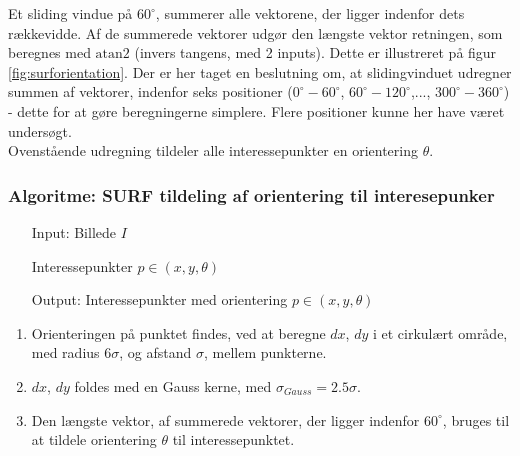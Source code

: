 Et sliding vindue på $60^{\circ}$, summerer alle vektorene, der ligger indenfor dets rækkevidde. Af de summerede vektorer udgør den længste vektor retningen, som beregnes med $\text{atan2}$ (invers tangens, med 2 inputs). Dette er illustreret på figur \ref{fig:surforientation}. Der er her taget en beslutning om, at slidingvinduet udregner summen af vektorer, indenfor seks positioner ($0^{\circ}-60^{\circ}$, $60^{\circ}-120^{\circ}$,..., $300^{\circ}-360^{\circ}$) - dette for at gøre beregningerne simplere. Flere positioner kunne her have været undersøgt.
\\
Ovenstående udregning tildeler alle interessepunkter en orientering $\theta$.
\subsubsection*{Algoritme: SURF tildeling af orientering til interesepunker}
\begin{enumerate}
\item[Input:] Billede $I$
\item[] Interessepunkter $p \in (x, y, \theta)$
\item[Output:] Interessepunkter med orientering $p \in (x, y, \theta)$
\end{enumerate}
\begin{enumerate}
\item Orienteringen på punktet findes, ved at beregne $dx$, $dy$ i et cirkulært område, med radius $6\sigma$, og afstand $\sigma$, mellem punkterne. 
\item $dx$, $dy$ foldes med en Gauss kerne, med $\sigma_{Gauss} = 2.5\sigma $.
\item Den længste vektor, af summerede vektorer, der ligger indenfor $60^{\circ}$, bruges til at tildele orientering $\theta$ til interessepunktet.
\end{enumerate}